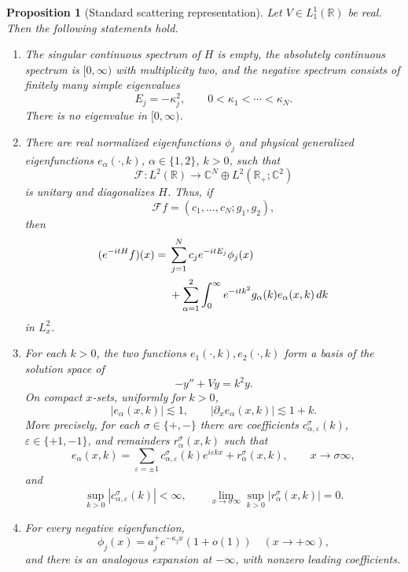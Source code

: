 \documentclass[11pt]{amsart}
\newtheorem{proposition}[theorem]{Proposition}
\numberwithin{equation}{section}
\theoremstyle{remark}
\newcommand{\R}{\mathbb R}
\newcommand{\C}{\mathbb C}
\begin{document}
\begin{proposition}[Standard scattering representation]\label{prop:scattering}
Let $V\in L^1_1(\R)$ be real.  Then the following statements hold.
\begin{enumerate}
\item The singular continuous spectrum of $H$ is empty, the absolutely
continuous spectrum is $[0,\infty)$ with multiplicity two, and the negative
spectrum consists of finitely many simple eigenvalues
\[
 E_j=-\kappa_j^2,
 \qquad 0<\kappa_1<\cdots<\kappa_N.
\]
There is no eigenvalue in $[0,\infty)$.

\item There are real normalized eigenfunctions $\phi_j$ and physical
generalized eigenfunctions $e_\alpha(\cdot,k)$, $\alpha\in\{1,2\}$, $k>0$,
such that
\[
 \mathcal F:
 L^2(\R)\longrightarrow
 \C^N\oplus L^2(\R_+;\C^2)
\]
is unitary and diagonalizes $H$.  Thus, if
\[
 \mathcal F f=(c_1,\ldots,c_N;g_1,g_2),
\]
then
\begin{align}
 (e^{-itH}f)(x)
 ={}&\sum_{j=1}^N c_j e^{-itE_j}\phi_j(x) \notag\\
 &+\sum_{\alpha=1}^2\int_0^\infty
       e^{-itk^2}g_\alpha(k)e_\alpha(x,k)\,dk
 \label{eq:spectral-expansion}
\end{align}
in $L^2_x$.

\item For each $k>0$, the two functions
$e_1(\cdot,k),e_2(\cdot,k)$ form a basis of the solution space of
\[
 -y''+Vy=k^2y.
\]
On compact $x$-sets, uniformly for $k>0$,
\begin{equation}
 |e_\alpha(x,k)|\lesssim 1,
 \qquad
 |\partial_x e_\alpha(x,k)|\lesssim 1+k.
 \label{eq:scattering-local-bounds}
\end{equation}
More precisely, for each $\sigma\in\{+,-\}$ there are coefficients
$c^{\sigma}_{\alpha,\varepsilon}(k)$, $\varepsilon\in\{+1,-1\}$, and
remainders $r^\sigma_\alpha(x,k)$ such that
\begin{equation}
 e_\alpha(x,k)
 =\sum_{\varepsilon=\pm1}
   c^{\sigma}_{\alpha,\varepsilon}(k)e^{i\varepsilon kx}
   +r^\sigma_\alpha(x,k),
 \qquad x\to\sigma\infty,
 \label{eq:uniform-scattering-expansion}
\end{equation}
and
\[
 \sup_{k>0}|c^{\sigma}_{\alpha,\varepsilon}(k)|<\infty,
 \qquad
 \lim_{x\to\sigma\infty}
 \sup_{k>0}|r^\sigma_\alpha(x,k)|=0.
\]

\item For every negative eigenfunction,
\begin{equation}
 \phi_j(x)=a_j^+e^{-\kappa_j x}(1+o(1))
 \quad (x\to+\infty),
 \label{eq:bound-tail-plus}
\end{equation}
and there is an analogous expansion at $-\infty$, with nonzero leading
coefficients.
\end{enumerate}
\end{proposition}
\end{document}
